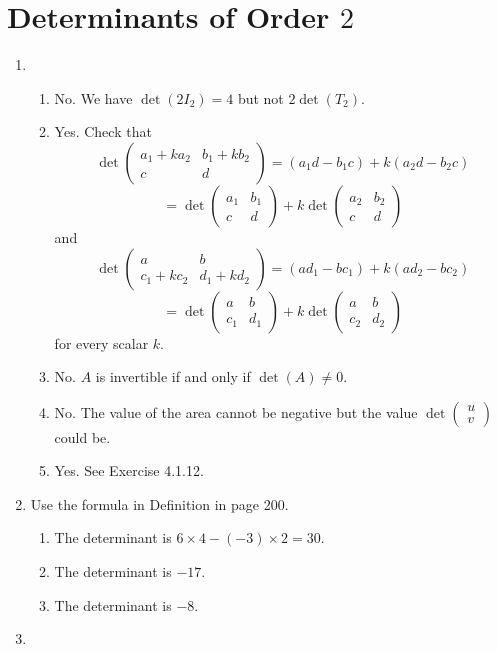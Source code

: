 \section{Determinants of Order $2$}
\begin{enumerate}
\item \begin{enumerate}
\item No. We have $\det(2I_2)=4$ but not $2\det(T_2)$.
\item Yes. Check that \[\det\begin{pmatrix}a_1+ka_2&b_1+kb_2\\c&d\end{pmatrix}=(a_1d-b_1c)+k(a_2d-b_2c)\]
\[=\det\begin{pmatrix}a_1&b_1\\c&d\end{pmatrix}+k\det\begin{pmatrix}a_2&b_2\\c&d\end{pmatrix}\]
and 
\[\det\begin{pmatrix}a&b\\c_1+kc_2&d_1+kd_2\end{pmatrix}=(ad_1-bc_1)+k(ad_2-bc_2)\]
\[=\det\begin{pmatrix}a&b\\c_1&d_1\end{pmatrix}+k\det\begin{pmatrix}a&b\\c_2&d_2\end{pmatrix}\]
for every scalar $k$.
\item No. $A$ is invertible if and only if $\det(A)\neq 0$.
\item No. The value of the area cannot be negative but the value $\det\begin{pmatrix}u\\v\end{pmatrix}$ could be.
\item Yes. See Exercise 4.1.12.
\end{enumerate}
\item Use the formula in Definition in page 200.\begin{enumerate}
\item The determinant is $6\times 4-(-3)\times 2=30$.
\item The determinant is $-17$.
\item The determinant is $-8$.
\end{enumerate}
\item \begin{enumerate}

\end{enumerate}
\end{enumerate}
